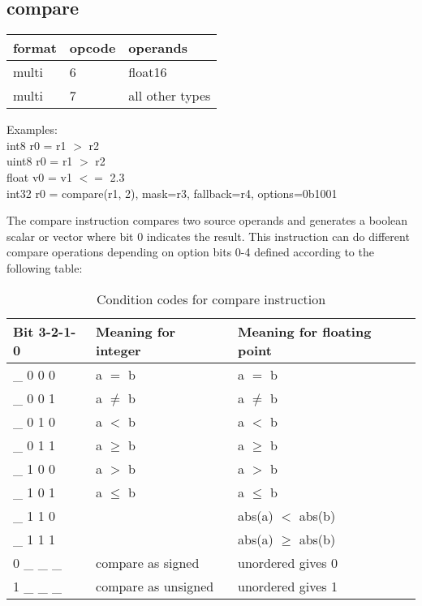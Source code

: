 \documentclass[forwardcom.tex]{subfiles}
\begin{document}
\subsection{compare} \label{compare}
\label{table:compareInstruction}
\begin{tabular}{|p{12mm}|p{15mm}|p{100mm}|}
\hline
\bfseries format & \bfseries opcode & \bfseries operands \\ \hline
multi &  6 & float16 \\ \hline
multi &  7 & all other types \\ \hline
\end{tabular}
\vv

Examples:\\
int8 r0 = r1 $>$ r2 \\
uint8 r0 = r1 $>$ r2 \\
float v0 = v1 $<=$ 2.3 \\
int32 r0 = compare(r1, 2), mask=r3, fallback=r4, options=0b1001
\vv

The compare instruction compares two source operands and generates a boolean scalar or vector where bit 0 indicates the result. This instruction can do different compare operations depending on option bits 0-4 defined according to the following table:

\begin{longtable} {|p{14mm}|p{50mm}|p{50mm}|}
\caption{Condition codes for compare instruction} 
\label{table:conditionCodesForCompareInstruction} \\
\endfirsthead
\endhead
\hline
\bfseries Bit 3-2-1-0 & \bfseries Meaning for integer & \bfseries Meaning for floating point \\
\hline
\_ 0 0 0 & a $=$ b    & a $=$ b \\
\_ 0 0 1 & a $\neq$ b & a $\neq$ b \\
\_ 0 1 0 & a $<$ b    & a $<$ b \\
\_ 0 1 1 & a $\geq$ b & a $\geq$ b \\
\_ 1 0 0 & a $>$ b    & a $>$ b \\
\_ 1 0 1 & a $\leq$ b & a $\leq$ b \\
\_ 1 1 0 &            & abs(a) $<$ abs(b) \\
\_ 1 1 1 &            & abs(a) $\geq$ abs(b) \\
\hline
0 \_ \_ \_ & compare as signed & unordered gives 0 \\
1 \_ \_ \_ & compare as unsigned & unordered gives 1 \\
\hline
\end{longtable}
\end{document}
